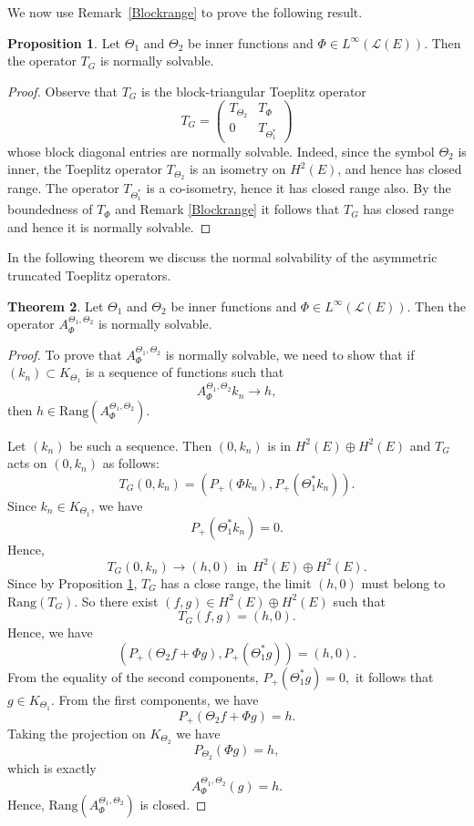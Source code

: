 \documentclass{amsart}
\theoremstyle{definition}
\newtheorem{thm}{Theorem}[section]
\newtheorem{prop}[thm]{Proposition}
\newcommand{\oL }{\mathcal{L}(E) }
\def\ni{\noindent}
\begin{document}
We now use Remark~\ref{Blockrange} to prove the following result.

\begin{prop} \label{prTG} Let $\Theta_1$ and $\Theta_2$ be inner functions and 
 $\Phi\in L^{\infty}(\oL)$. Then the operator $T_{G}$ is normally solvable.
\end{prop}
\begin{proof}
Observe that $T_{G}$ is the block-triangular Toeplitz operator
$$T_{G}=
\begin{pmatrix}
    T_{\Theta_2}& T_{\Phi}\\
    0& T_{\Theta^{*}_{1}}
\end{pmatrix}
$$
whose block diagonal entries are normally solvable. Indeed, since the symbol $\Theta_2$ is inner, the Toeplitz operator $T_{\Theta_2}$ is an isometry on $H^2(E)$, and hence has closed range. The operator $T_{\Theta^{*}_{1}}$ is a co-isometry, hence it has closed range also. 
By the boundedness of $T_\Phi$ and Remark \ref{Blockrange} it follows that $T_{G}$ has closed range and hence it is normally solvable.
\end{proof}
In the following theorem we discuss the normal solvability of the asymmetric truncated Toeplitz operators.


\begin{thm} \label{ATTO} Let $\Theta_1$ and $\Theta_2$ be inner functions and 
 $\Phi\in L^\infty(\oL)$.  Then the operator $A_{\Phi}^{\Theta_1, \Theta_2}$ is normally solvable.
\end{thm}

\begin{proof}
To prove that $A_{\Phi}^{\Theta_1, \Theta_2}$ is normally solvable, we need to show that if $(k_n)\subset K_{\Theta_1}$ is a sequence of functions such that
    $$A_{\Phi}^{\Theta_1, \Theta_2}k_n\to h,$$
 then $h\in \text{Rang}(A_{\Phi}^{\Theta_1, \Theta_2})$.

Let $(k_n)$ be such a sequence. Then $(0, k_n)$ is in $H^2(E)\oplus H^2(E)$ and $T_{G}$ acts on 
$(0, k_n)$ as follows:
    $$T_{G}(0, k_n)=(P_{+}(\Phi k_n), P_{+}(\Theta^{*}_1 k_n)).$$    
Since $k_{n}\in K_{\Theta_1}$, we have
    $$P_{+}(\Theta^{*}_1 k_{n})=0.$$
    Hence,
    $$T_{G}(0, k_n)\to (h, 0)~~\text{in} ~~H^2(E)\oplus H^2(E).$$
    Since by Proposition \ref{prTG},  $T_{G}$ has a close range, the limit $(h, 0)$ must belong to $\text{Rang}(T_{G})$. So there exist $(f, g)\in H^2(E)\oplus H^2(E)$ such that $$T_{G}(f, g)=(h, 0).$$ Hence, we have
    $$(P_{+}(\Theta_2 f+\Phi g), P_{+}(\Theta^{*}_1 g))=(h, 0).$$
    From the equality of the second components, $P_{+}(\Theta^{*}_1 g)=0,$ it follows that  $g\in K_{\Theta_1}$. From the first components, we have
    $$P_{+}(\Theta_2 f+\Phi g)=h.$$
    Taking the projection on $K_{\Theta_2}$ we have
    $$P_{\Theta_2}(\Phi g)=h,$$ which is exactly
    $$A_{\Phi}^{\Theta_1, \Theta_2}(g)=h.$$ Hence,
    $\text{Rang}(A_{\Phi}^{\Theta_1, \Theta_2})$ is closed.
\end{proof}
\end{document}
